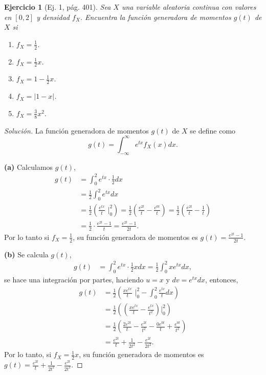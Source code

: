 \documentclass[12pt,letterpaper]{article}
\newtheorem{ej}{Ejercicio}
\begin{document}
\begin{ej}[Ej. 1, pág. 401]
Sea $X$ una variable aleatoria continua con valores en $[0,2]$ y densidad $f_{X}$. Encuentra la función generadora de momentos $g(t)$ de $X$ si
\begin{enumerate}
\item[(a)] $f_{X} = \frac{1}{2}$.
\item[(b)] $f_{X} = \frac{1}{2}x$.
\item[(c)] $f_{X} = 1 - \frac{1}{2}x$.
\item[(d)] $f_{X} = |1-x|$.
\item[(e)] $f_{X} = \frac{3}{8}x^{2}.$
\end{enumerate}
\end{ej}

\begin{proof}[Solución]
La función generadora de momentos $g(t)$ de $X$  se define \cite{snell} como
\begin{equation}
g(t) = \int_{-\infty}^{\infty}e^{tx} f_{X}(x) dx.
\end{equation}

\textbf{(a)} Calculamos $g(t)$,
\begin{align}
g(t) &= \int_{0}^{2} e^{tx} \cdot \frac{1}{2} dx \\
&= \frac{1}{2} \int_{0}^{2} e^{tx} dx \\
&= \frac{1}{2} \left( \frac{e^{tx}}{t} \, \,\Big\lvert^{2}_{0}\right) = \frac{1}{2} \left( \frac{e^{2t}}{t} - \frac{e^{0t}}{t} \right) = \frac{1}{2} \left( \frac{e^{2t}}{t} - \frac{1}{t}\right) \\ 
&= \frac{1}{2} \cdot \frac{e^{2t}-1}{t} = \frac{e^{2t}-1}{2t}.
\end{align}
Por lo tanto si $f_X = \frac{1}{2}$, su función generadora de momentos es $g(t)=\frac{e^{2t}-1}{2t}$.

\textbf{(b)} Se calcula $g(t)$,
\begin{align}
g(t) &= \int_{0}^{2} e^{tx} \cdot \frac{1}{2} x dx = \frac{1}{2}\int_{0}^{2} xe^{tx}dx, 
\end{align}
se hace una integración por partes, haciendo $u=x$ y $dv=e^{tx}dx$, entonces,
\begin{align}
g(t) &= \frac{1}{2} \left( \frac{xe^{tx}}{t}\,\,\Big\lvert ^{2}_{0} - \int^{2}_{0} \frac{e^{tx}}{t}dx\right) \\
&= \frac{1}{2} \left( \left(\frac{xe^{tx}}{t} - \frac{e^{tx}}{t^{2}} \right)\Big\lvert ^{2}_{0} \right) \\
&= \frac{1}{2} \left( \frac{2e^{2t}}{t} - \frac{e^{2t}}{t^{2}} - \frac{0e^{0t}}{t} + \frac{e^{0t}}{t^2}\right) \\ 
&= \frac{e^{2t}}{t} + \frac{1}{2t^2} - \frac{e^{2t}}{2t^2}.
\end{align}
Por lo tanto, si $f_{X} = \frac{1}{2}x$, su función generadora de momentos es $g(t) = \frac{e^{2t}}{t} + \frac{1}{2t^2} - \frac{e^{2t}}{2t^2}.$


\end{proof}
\end{document}
